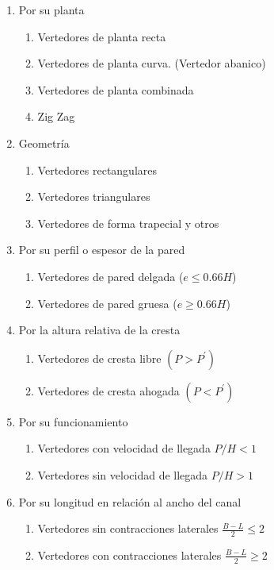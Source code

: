 \begin{enumerate}
    \item Por su planta \begin{enumerate}
        \item Vertedores de planta recta
        \item Vertedores de planta curva. (Vertedor abanico)
        \item Vertedores de planta combinada
        \item Zig Zag
    \end{enumerate}
    \item Geometría \begin{enumerate}
        \item Vertedores rectangulares
        \item Vertedores triangulares
        \item Vertedores de forma trapecial y otros
    \end{enumerate}
    \item Por su perfil o espesor de la pared \begin{enumerate}
        \item Vertedores de pared delgada ($e\leq 0.66H$)
        \item Vertedores de pared gruesa ($e\geq 0.66H$)
    \end{enumerate}
    \item Por la altura relativa de la cresta \begin{enumerate}
        \item Vertedores de cresta libre $(P>P^{\prime})$
        \item Vertedores de cresta ahogada $(P<P^{\prime})$
    \end{enumerate}
    \item Por su funcionamiento \begin{enumerate}
        \item Vertedores con velocidad de llegada $P/H <1$
        \item Vertedores sin velocidad de llegada $P/H > 1$
    \end{enumerate}
    \item Por su longitud en relación al ancho del canal \begin{enumerate}
        \item Vertedores sin contracciones laterales $\frac{B-L}{2}\leq 2 $
        \item Vertedores con contracciones laterales $\frac{B-L}{2}\geq 2$
    \end{enumerate}
\end{enumerate}

